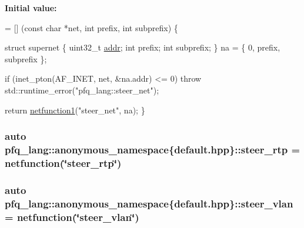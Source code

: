 {\bfseries Initial value\-:}
\begin{DoxyCode}
= [] (\textcolor{keyword}{const} \textcolor{keywordtype}{char} *net, \textcolor{keywordtype}{int} prefix, \textcolor{keywordtype}{int} subprefix) \{

                                \textcolor{keyword}{struct }supernet \{
                                    uint32\_t \hyperlink{namespacepfq__lang_1_1anonymous__namespace_02default_8hpp_03_aafce8334d1be83bff9a2115439c8c453}{addr};
                                    \textcolor{keywordtype}{int}      prefix;
                                    \textcolor{keywordtype}{int}      subprefix;
                                \} na = \{ 0, prefix, subprefix \};

                                \textcolor{keywordflow}{if} (inet\_pton(AF\_INET, net, &na.addr) <= 0)
                                    \textcolor{keywordflow}{throw} std::runtime\_error(\textcolor{stringliteral}{"pfq\_lang::steer\_net"});

                                \textcolor{keywordflow}{return} \hyperlink{namespacepfq__lang_af215f25fa7ebd61fdc90cf0ef78a3164}{netfunction1}(\textcolor{stringliteral}{"steer\_net"}, na);
                             \}
\end{DoxyCode}
\hypertarget{namespacepfq__lang_1_1anonymous__namespace_02default_8hpp_03_a16b18fdc10f8dd8c0974d9f0d6c13af9}{
\subsubsection[{steer\-\_\-rtp}]{\setlength{\rightskip}{0pt plus 5cm}auto pfq\-\_\-lang\-::anonymous\-\_\-namespace\{default.\-hpp\}\-::steer\-\_\-rtp = {\bf netfunction}(\char`\"{}steer\-\_\-rtp\char`\"{})}}\label{namespacepfq__lang_1_1anonymous__namespace_02default_8hpp_03_a16b18fdc10f8dd8c0974d9f0d6c13af9}
\hypertarget{namespacepfq__lang_1_1anonymous__namespace_02default_8hpp_03_ad32804252244d5b572b9f5fe0cdda675}{
\subsubsection[{steer\-\_\-vlan}]{\setlength{\rightskip}{0pt plus 5cm}auto pfq\-\_\-lang\-::anonymous\-\_\-namespace\{default.\-hpp\}\-::steer\-\_\-vlan = {\bf netfunction}(\char`\"{}steer\-\_\-vlan\char`\"{})}}\label{namespacepfq__lang_1_1anonymous__namespace_02default_8hpp_03_ad32804252244d5b572b9f5fe0cdda675}
